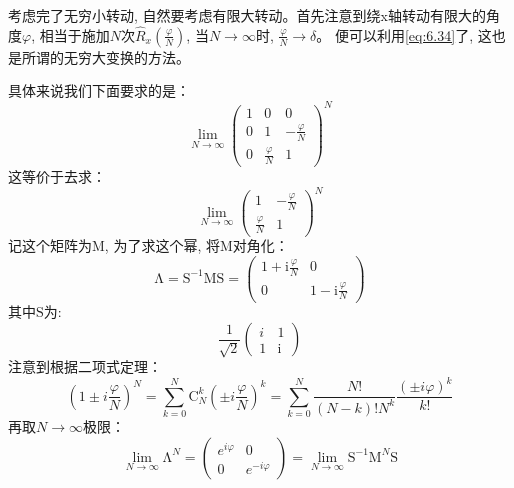 \documentclass[a4paper,zihao=-4,linespread=1]{ctexrep}
\begin{document}
    考虑完了无穷小转动, 自然要考虑有限大转动。首先注意到绕x轴转动有限大的角度$\varphi$, 相当于施加$N$次$\hat{R}_x\left(\frac{\varphi}{N}\right)$, 当$N\to\infty$时, $\frac{\varphi}{N}\to\delta$。
    便可以利用\ref{eq:6.34}了, 这也是所谓的无穷大变换的方法。
    
    具体来说我们下面要求的是：
    \begin{equation}
        \lim_{N\to\infty}
        \left(\begin{array}{ccc}
            1 & 0 & 0 \\
            0 & 1 & -\frac{\varphi}{N} \\
            0 & \frac{\varphi}{N}& 1
            \end{array}\right)^N
    \end{equation}
    这等价于去求：
    \begin{equation}
        \lim_{N\to\infty}
        \left(\begin{array}{ccc}
            1 & -\frac{\varphi}{N} \\
            \frac{\varphi}{N}& 1
            \end{array}\right)^N
    \end{equation}
    记这个矩阵为$\mathrm{M}$, 为了求这个幂, 将$\mathrm{M}$对角化：
    \begin{equation}
        \mathrm{\Lambda}=\mathrm{S}^{-1}\mathrm{M}\mathrm{S}=\begin{pmatrix}
            1+\mathrm i\frac{\varphi}{N} &0 \\
           0 &1-\mathrm  i\frac{\varphi}{N} 
          \end{pmatrix}
    \end{equation}
    其中$\mathrm{S}$为:
    \[
        \frac{1}{\sqrt{2}}\begin{pmatrix}
            i &1 \\
            1 &\mathrm i
           \end{pmatrix}
    \]
    注意到根据二项式定理：
    \begin{equation}
        \left(1 \pm i \frac{\varphi}{N}\right)^{N}=\sum_{k=0}^{N}\mathrm C_N^{k}\left(\pm i \frac{\varphi}{N}\right)^{k}=\sum_{k=0}^{N} \frac{N !}{(N-k) ! N^{k}} \frac{(\pm i \varphi)^{k}}{k !}
    \end{equation}
    再取$N\to \infty$极限：
    \begin{equation}
        \lim_{N\to\infty}\mathrm{\Lambda}^N=
        \begin{pmatrix}
            e^{i\varphi} &0 \\
            0 &e^{-i\varphi}
        \end{pmatrix}
        =\lim_{N\to\infty}\mathrm{S}^{-1}\mathrm{M}^N\mathrm{S}
    \end{equation}
\end{document}
